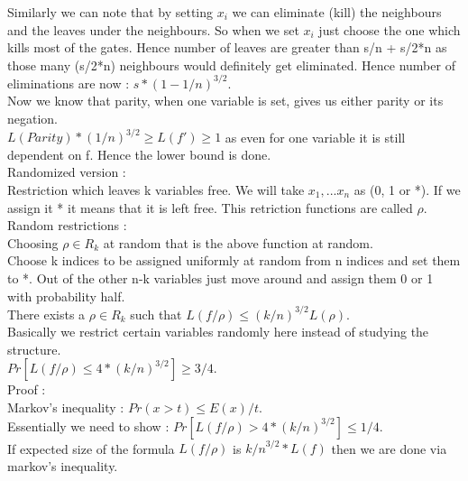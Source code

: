 \documentclass[solution,addpoints,12pt]{exam}
\begin{document}
Similarly we can note that by setting $x_i$ we can eliminate (kill)
the neighbours and the leaves under the neighbours.
So when we set $x_i$ just choose the one which kills most of the gates.
Hence number of leaves are greater than s/n + s/2*n as those many (s/2*n)
neighbours would definitely get eliminated. Hence number of
eliminations are now : $s*{(1 - 1/n)}^{3/2}$.\\
Now we know that parity, when one variable is set, gives
us either parity or its negation.\\
$L(Parity)*(1/n)^{3/2} \ge L(f') \ge 1$ as even for one variable it
is still dependent on f. Hence the lower bound is done.\\

Randomized version :\\
Restriction which leaves k variables free. We will
take $x_1, ... x_n$ as (0, 1 or *). If we assign it * it means that it is
left free. This retriction functions are called $\rho$.\\
Random restrictions :\\
Choosing $\rho \in R_k$ at random that is the above function at random.\\
Choose k indices to be assigned uniformly at random from n indices and
set them to *. Out of the other n-k variables just move around and
assign them 0 or 1 with probability half.\\
There exists a $\rho \in R_k$ such that $L(f/\rho) \le (k/n)^{3/2}L(\rho)$.\\
Basically we restrict certain variables randomly here instead of studying the
structure.\\

$Pr[L(f/\rho) \le 4*{(k/n)}^{3/2}] \ge 3/4$.\\
Proof :\\
Markov's inequality : $Pr(x > t) \le E(x)/t$.\\
Essentially we need to show :
$Pr[L(f/\rho) > 4*{(k/n)}^{3/2}] \le 1/4$.\\
If expected size of the formula $L(f/\rho)$ is ${k/n}^{3/2}*L(f)$
then we are done via markov's inequality.\\
\end{document}
